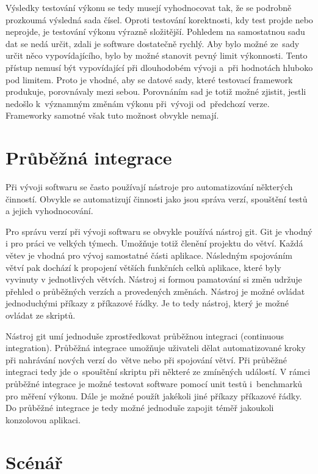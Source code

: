 Výsledky testování výkonu se tedy musejí vyhodnocovat tak, že se podrobně prozkoumá výsledná sada čísel.
Oproti testování korektnosti, kdy test projde nebo neprojde, je testování výkonu výrazně složitější.
Pohledem na samostatnou sadu dat se nedá určit, zdali je software dostatečně rychlý. Aby bylo možné
ze~sady určit něco vypovídajícího, bylo by možné stanovit pevný limit výkonnosti.
Tento přístup nemusí být vypovídající při dlouhodobém vývoji
a~při hodnotách hluboko pod limitem. Proto je vhodné, aby se datové sady, které testovací framework produkuje,
porovnávaly mezi sebou. Porovnáním sad je totiž možné zjistit, jestli nedošlo k~významným změnám výkonu
při~vývoji od~předchozí verze. Frameworky samotné však tuto možnost obvykle nemají.

\section{Průběžná integrace}
Při vývoji softwaru se často používají nástroje pro automatizování některých činností.
Obvykle se automatizují činnosti jako jsou správa verzí, spouštění testů a jejich vyhodnocování.

Pro správu verzí při vývoji softwaru se obvykle používá nástroj git.
Git je vhodný i pro práci ve velkých týmech.
Umožňuje totiž členění projektu do větví. Každá větev je vhodná pro vývoj samostatné části aplikace.
Následným spojováním větví pak dochází k propojení větších funkčních celků aplikace, které byly vyvinuty v jednotlivých větvích.
Nástroj si formou pamatování si změn udržuje přehled o průběžných verzích a provedených změnách.
Nástroj je možné ovládat jednoduchými příkazy z příkazové řádky.
Je to tedy nástroj, který je možné ovládat ze skriptů.

Nástroj git umí jednoduše zprostředkovat průběžnou integraci (continuous integration). Průběžná integrace umožňuje uživateli dělat automatizované
kroky při nahrávání nových verzí do~větve nebo při spojování větví. Při průběžné integraci tedy jde o~spouštění
skriptu při některé ze zmíněných událostí. V rámci průběžné integrace je možné testovat software pomocí unit testů
i~benchmarků pro měření výkonu. Dále je možné použít jakékoli jiné příkazy příkazové řádky.
Do průběžné integrace je tedy možné jednoduše zapojit téměř jakoukoli konzolovou aplikaci.

\section{Scénář}

